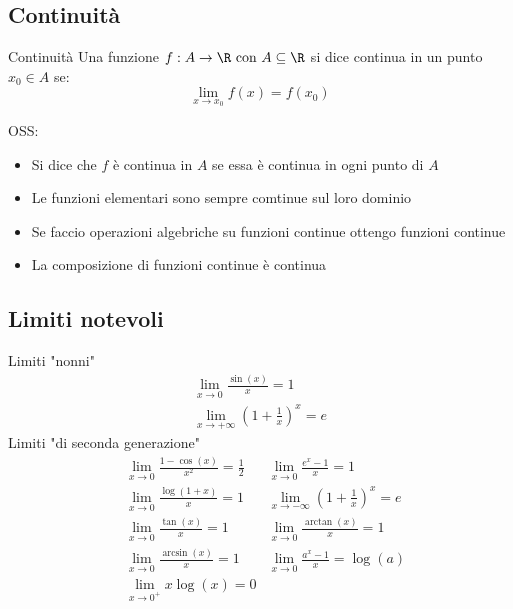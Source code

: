 \subsection{Continuità}
\begin{definizione}{Continuità}
	Una funzione $ f: A \rightarrow \R \text{ con } A \subseteq \R$ si dice continua in un punto $x_0 \in  A$ se:
	\[
		\lim_{x \to x_0} f(x) = f\left( x_0 \right)
	\]
\end{definizione}

OSS:
\begin{itemize}
	\item Si dice che $f$ è continua in $A$ se essa è continua in ogni punto di $A$
	\item Le funzioni elementari sono sempre comtinue sul loro dominio
	\item Se faccio operazioni algebriche su funzioni continue ottengo funzioni continue
	\item La composizione di funzioni continue è continua
\end{itemize}
\subsection{Limiti notevoli}
Limiti "nonni"
\begin{gather}
	\lim_{x \to 0} \frac{\sin\left( x \right) }{x} = 1 \\
	\lim_{x \to + \infty} \left( 1+\frac{1}{x} \right) ^{x} = e
\end{gather}
Limiti "di seconda generazione"
\begin{align*}
	 & \lim_{x \to 0} \frac{1-\cos\left( x \right) }{x^2} = \frac{1}{2} & \lim_{x \to 0} \frac{e^{x}-1}{x}=1                         \\
	 & \lim_{x \to 0} \frac{\log\left( 1+x \right) }{x}=1               & \lim_{x \to -\infty} \left( 1+\frac{1}{x} \right) ^{x} = e \\
	 & \lim_{x \to 0} \frac{ \tan \left( x \right) }{x}=1               & \lim_{x \to 0} \frac{\arctan \left( x \right) }{x} = 1     \\
	 & \lim_{x \to 0} \frac{\arcsin \left( x \right) }{x} = 1           & \lim_{x \to 0} \frac{a^{x}-1}{x}= \log \left( a \right)    \\
	 & \lim_{x \to 0^{+}} x \log \left( x \right) =0
\end{align*}
